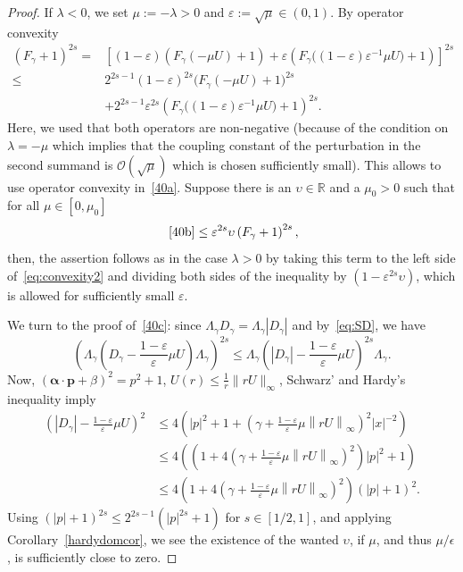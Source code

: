 \documentclass[AHL,Unicode,longabstracts,published]{cedram}
\newcommand*\rz{\mathbb{R}}
\newcommand*\cO{\mathcal{O}}
\newcommand*\balpha{\bm{\alpha}}
\newcommand*\bp{\bm{p}}
\begin{document}
\begin{proof}
If $\lambda<0$, we set $\mu:=-\lambda>0$ and $\varepsilon:=\sqrt\mu\in(0,1)$. By operator convexity
\begin{align}
\left(F_\gamma+1\right)^{2s} = &\left[(1-\varepsilon)\left(F_\gamma\left(-\mu U\right)+1\right) + \varepsilon\left(F_\gamma\big((1-\varepsilon)\varepsilon^{-1}\mu U\big)+1 \right)\right]^{2s}\label{eq:convexity2}\\
\leq &2^{2s-1}(1-\varepsilon)^{2s}\big(F_\gamma\left(-\mu U\right)+1\big)^{2s}\label{40a}\\
& + 2^{2s-1}\varepsilon^{2s}\left(F_\gamma\big((1-\varepsilon)\varepsilon^{-1}\mu U\big)+1\right)^{2s}.\label{40b}
\end{align}
Here, we used that both operators are non-negative (because of the condition on $\lambda=-\mu$ which implies that the coupling constant of the perturbation in the second summand is $\cO(\sqrt\mu)$ which is chosen sufficiently small). This allows to use operator convexity in~\eqref{40a}. Suppose there is an $\upsilon\in\rz$ and a $\mu_0>0$ such that for all $\mu\in[0,\mu_0]$
\begin{equation}\label{40c}
~\eqref{40b} \leq \varepsilon^{2s}\upsilon\left(F_\gamma+1\right)^{2s},
\end{equation}
then, the assertion follows as in the case $\lambda>0$ by taking this term to the left side of~\eqref{eq:convexity2} and dividing both sides of the inequality by $(1-\varepsilon^{2s}\upsilon)$, which is allowed for sufficiently small $\varepsilon$.

We turn to the proof of~\eqref{40c}: since $\Lambda_\gamma D_\gamma=\Lambda_\gamma|D_\gamma|$ and by~\eqref{eq:SD}, we have
\[
\left(\Lambda_\gamma\left(D_\gamma-\frac{1-\varepsilon}{\varepsilon}\mu U\right)\Lambda_\gamma\right)^{2s} \leq \Lambda_\gamma\left(\left|D_\gamma\right|-\frac{1-\varepsilon}{\varepsilon}\mu U\right)^{2s}\Lambda_\gamma.
\]
Now, $(\balpha\cdot\bp+\beta)^2=p^2+1$, $U(r)\leq\tfrac1r\|rU\|_\infty $, Schwarz' and Hardy's inequality imply
\begin{align*}
\left(\left|D_\gamma\right|-\frac{1-\varepsilon}{\varepsilon}\mu U\right)^2 & \leq 4\left(|p|^2+1+\left(\gamma+\frac{1-\varepsilon}{\varepsilon}\mu\left\|rU\right\|_\infty\right)^2|x|^{-2}\right)\\
& \leq 4\left(\left(1+4\left(\gamma+\frac{1-\varepsilon}{\varepsilon}\mu\left\|rU\right\|_\infty\right)^2\right)|p|^2+1\right)\\
& \leq 4\left(1+4\left(\gamma+\frac{1-\varepsilon}{\varepsilon}\mu\left\|rU\right\|_\infty\right)^2\right)\left(|p|+1\right)^2.
\end{align*}
Using $(|p|+1)^{2s}\leq2^{2s-1}(|p|^{2s}+1)$ for $s\in[1/2,1]$, and applying Corollary~\ref{hardydomcor}, we see the existence of the wanted $\upsilon$, if $\mu$, and thus $\mu/\epsilon$, is sufficiently close to zero.
\end{proof}
\end{document}
